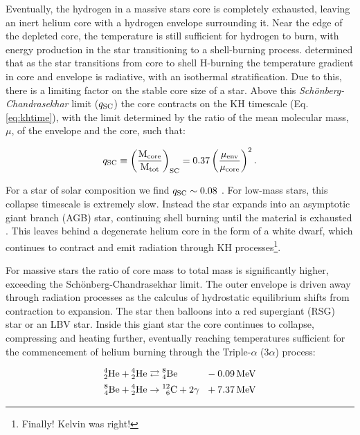 Eventually, the hydrogen in a massive stars core is completely exhausted, leaving an inert helium core with a hydrogen envelope surrounding it.
Near the edge of the depleted core, the temperature is still sufficient for hydrogen to burn, with energy production in the star transitioning to a shell-burning process.
\textcite{schonbergEvolutionMainSequenceStars1942} determined that as the star transitions from core to shell H-burning the temperature gradient in core and envelope is radiative, with an isothermal stratification.
Due to this, there is a limiting factor on the stable core size of a star.
Above this \emph{Sch{\"o}nberg-Chandrasekhar} limit ($q\rms{SC}$) the core contracts on the KH timescale (Eq. \ref{eq:khtime}), with the limit determined by the ratio of the mean molecular mass, $\mu$, of the envelope and the core, such that:

\begin{equation}
  q\rms{SC} \equiv \left(\frac{\mass\rms{core}}{\mass\rms{tot}}\right)\rms{SC} = 0.37 \left(\frac{\mu\rms{env}}{\mu\rms{core}}\right)^2 .
\end{equation}

\noindent
For a star of solar composition we find $q\rms{SC} \sim 0.08$
\parencite[Ch.~5]{salarisEvolutionStarsStellar2005}.
For low-mass stars, this collapse timescale is extremely slow.
Instead the star expands into an asymptotic giant branch (AGB) star, continuing shell burning until the material is exhausted
\parencite{beechSchoenbergChandrasekharLimitPolytropic1988}.
This leaves behind a degenerate helium core in the form of a white dwarf, which continues to contract and emit radiation through KH processes\footnote{Finally! Kelvin was right!}.

For massive stars the ratio of core mass to total mass is significantly higher, exceeding the Sch{\"o}nberg-Chandrasekhar limit.
The outer envelope is driven away through radiation processes as the calculus of hydrostatic equilibrium shifts from contraction to expansion.
The star then balloons into a red supergiant (RSG) star or an LBV star.
Inside this giant star the core continues to collapse, compressing and heating further, eventually reaching temperatures sufficient for the commencement of helium burning through the Triple-$\alpha$ (3$\alpha$) process:

\begin{equation}
  \begin{alignedat}{3}
    \atom{He}{4}{2} + \atom{He}{4}{2} & \rightleftarrows \atom{Be}{8}{4} && ~~ - \SI{0.09}{\mega\electronvolt} \\
    \atom{Be}{8}{4} + \atom{He}{4}{2} & \rightarrow \atom{C}{12}{6} + 2\gamma && ~~ + \SI{7.37}{\mega\electronvolt} 
  \end{alignedat}
\end{equation}

